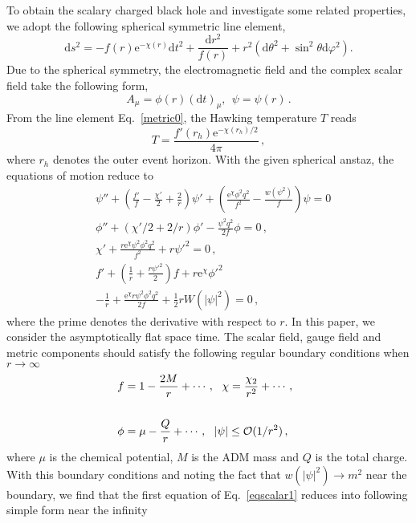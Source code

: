 \documentclass[pr, twocolumn, preprintnumbers, showpacs,footnoteadded, superscriptaddress,nofootinbib,longbibliography]{revtex4-1}
\newcommand{\td}{\mathrm{d}}
\newcommand{\te}{\mathrm{e}}
\begin{document}
To obtain the scalary charged black hole and investigate some related properties, we adopt the following spherical symmetric line element,
%
\begin{equation}\label{metric0}
  \td s^2=-f(r)\te^{-\chi(r)}\td t^2+\frac{\td r^2}{f(r)}+r^2(\td \theta^2 + \sin^2 \theta \td \varphi^2).
\end{equation}
%
Due to the spherical symmetry, the electromagnetic field and the complex scalar field take the following form,
%
\begin{equation}\label{matters1}
  A_\mu=\phi(r)(\td t)_\mu,~~\psi=\psi(r)\,.
\end{equation}
%
From the line element Eq.~\eqref{metric0}, the Hawking temperature $T$ reads
%
\begin{equation}\label{hawkT1}
  T=\frac{f'(r_h)\te^{-\chi(r_h)/2}}{4\pi}\, ,
\end{equation}
%
where $r_h$ denotes the outer event horizon.
With the given spherical anstaz, the equations of motion reduce to
%
\begin{equation}\label{eqscalar1}
\begin{split}
  &\psi''+\left(\frac{f'}{f}-\frac{\chi'}2+\frac2r\right)\psi'+\left(\frac{\te^{\chi}\phi^2q^2}{f^2}-\frac{w(\psi^2)}{f}\right)\psi=0\\
  &\phi''+(\chi'/2+2/r)\phi'-\frac{\psi^2q^2}{2f}\phi=0\,,\\
  &\chi'+\frac{r\te^{\chi}\psi^2\phi^2q^2}{f^2}+r\psi'^2=0\,,\\
  &f'+\left(\frac1r+\frac{r\psi'^2}2\right)f+r\te^{\chi}\phi'^2 \\
  &-\frac1r+\frac{\te^{\chi}r\psi^2\phi^2q^2}{2f}+\frac12rW(|\psi|^2)=0\, ,
  \end{split}
\end{equation}
%
where the prime denotes the derivative with respect to $r$. In this paper, we consider the asymptotically flat space time. The scalar field, gauge field and metric components should satisfy the following regular boundary conditions when $r\rightarrow\infty$
%
\begin{eqnarray}\label{bdcond1}
  &f=1-\frac{2M}r+\cdots,~~\chi=\frac{\chi_2}{r^2}+\cdots \, , \cr
  ~\cr
  &\phi=\mu-\frac{Q}{r}+\cdots,~~|\psi|\leq\mathcal{O}(1/r^2)\, ,
\end{eqnarray}
%
where $\mu$ is the chemical potential, $M$ is the ADM mass and $Q$ is the total charge. With this boundary conditions and noting the fact that $w(|\psi|^2)\rightarrow m^2$ near the boundary, we find that the first equation of Eq.~\eqref{eqscalar1} reduces into following simple form near the infinity
\end{document}
